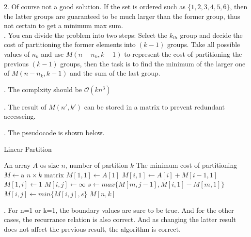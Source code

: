 \documentclass{article}
\begin{document}
{ 2. Of course not a good solution. If the set is ordered such as $\{1,2,3,4,5,6\}$, then the latter groups are guaranteed to be much larger than the former group, thus not certain to get a minimum max sum.\\

{. You can divide the problem into two steps: Select the $k_{th}$ group and decide the cost of partitioning the former elements into $(k-1)$ groups. Take all possible values of $n_k$ and use $M(n-n_k,k-1)$ to represent the cost of partitioning the previous $(k-1)$ groups, then the task is to find the minimum of the larger one of $M(n-n_k,k-1)$ and the sum of the last group.\\}

{. The complxity should be $\mathcal{O}(kn^3)$\\}

{. The result of $M(n',k')$ can be stored in a matrix to prevent redundant accesseing.\\}

{. The pseudocode is shown below.}
 
    \begin{algorithm}[H]
        \caption{Linear Partition}  
        \begin{algorithmic}[1]   
            \Require  An array $A$ os size $n$, number of partition $k$
            \Ensure The minimum cost of partitioning
            \State $M\gets \text{a }n\times k\text{ matrix}$
            \State $M[1,1]\gets A[1]$
                \State $M[i,1]\gets A[i]+M[i-1,1]$
            \EndFor
                \State $M[1,i]\gets 1$
            \EndFor
                    \State $M[i,j]\gets \infty$
                        \State $s\gets max\{M[m,j-1],M[i,1]-M[m,1]\}$
                        \State $M[i,j]\gets min\{M[i,j],s\}$
                    \EndFor
                \EndFor
            \EndFor
            \State \Return $M[n,k]$
            
        \end{algorithmic}  
    \end{algorithm}

{. For n=1 or k=1, the boundary values are sure to be true. And for the other cases, the recurrance relation is also correct. And as changing the latter result does not affect the previous result, the algorithm is correct.\\}

}
\end{document}
